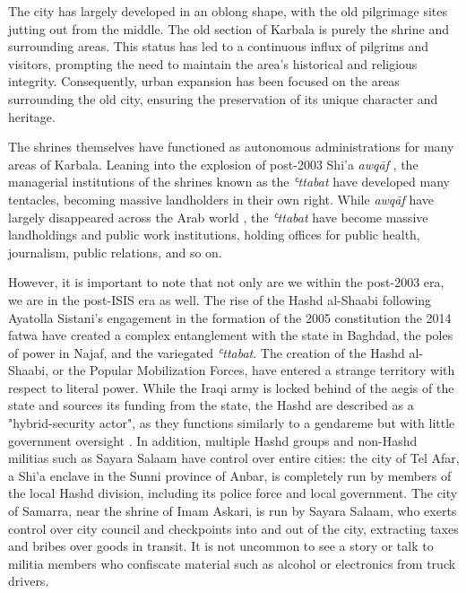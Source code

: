 The city has largely developed in an oblong shape, with the old pilgrimage sites jutting out from the middle. The old section of Karbala is purely the shrine and surrounding areas. This status has led to a continuous influx of pilgrims and visitors, prompting the need to maintain the area's historical and religious integrity. Consequently, urban expansion has been focused on the areas surrounding the old city, ensuring the preservation of its unique character and heritage.

The shrines themselves have functioned as autonomous administrations for many areas of Karbala. Leaning into the explosion of post-2003 Shi'a \emph{awqāf} \cite{hamdan_development_2012}, the managerial institutions of the shrines known as the \emph{ʿttabat}  have developed many tentacles, becoming massive landholders in their own right. While \emph{awqāf} have largely disappeared across the Arab world \cite{moumtaz_gods_2021}, the \emph{ʿttabat}  have become massive landholdings and public work institutions, holding offices for public health, journalism, public relations, and so on. 

However, it is important to note that not only are we within the post-2003 era, we are in the post-ISIS era as well. The rise of the Hashd al-Shaabi following Ayatolla Sistani's engagement in the formation of the 2005 constitution \cite{al-rahim_sistani_2005} the 2014 fatwa \cite{rudolf_battlefield_2018}\cite{ann_wainscott_engaging_2019} have created a complex entanglement with the state in Baghdad, the poles of power in Najaf, and the variegated \emph{ʿttabat}. The creation of the Hashd al-Shaabi, or the Popular Mobilization Forces, have entered a strange territory with respect to literal power. While the Iraqi army is locked behind of the aegis of the state and sources its funding from the state, the Hashd are described as a "hybrid-security actor", as they functions similarly to a gendareme but with little government oversight \cite{cambanis_hybrid_2019} \cite{renad_mansour_popular_2018}. In addition, multiple Hashd groups and non-Hashd militias such as Sayara Salaam have control over entire cities: the city of Tel Afar, a Shi'a enclave in the Sunni province of Anbar, is completely run by members of the local Hashd division, including its police force and local government. The city of Samarra, near the shrine of Imam Askari, is run by Sayara Salaam, who exerts control over city council and checkpoints into and out of the city, extracting taxes and bribes over goods in transit. It is not uncommon to see a story or talk to militia members who confiscate material such as alcohol or electronics from truck drivers. 

